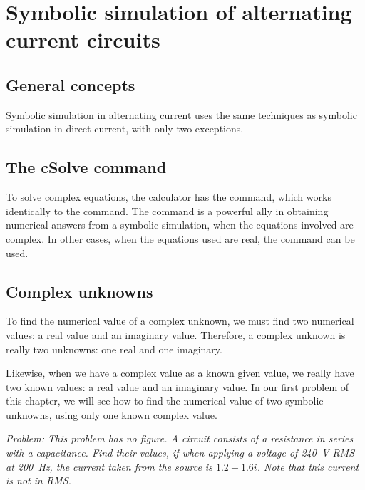 
\chapter{Symbolic simulation of alternating current circuits}

\section{General concepts}

Symbolic simulation in alternating current uses the same techniques
as symbolic simulation in direct current, with only two exceptions.

\section{The cSolve command}

To solve complex equations, the calculator has the 
command, which works identically to the  command. The
 command is a powerful ally in obtaining numerical
answers from a symbolic simulation, when the equations involved are
complex. In other cases, when the equations used are real, the
 command can be used.

\section{Complex unknowns}

To find the numerical value of a complex unknown, we must find two
numerical values: a real value and an imaginary value. Therefore, a
complex unknown is really two unknowns: one real and one imaginary.

Likewise, when we have a complex value as a known given value, we
really have two known values: a real value and an imaginary value.
In our first problem of this chapter, we will see how to find the
numerical value of two symbolic unknowns, using only one known
complex value.


\emph{Problem: This problem has no figure. A circuit consists of a
resistance in series with a capacitance. Find their values, if when
applying a voltage of 240~V RMS at 200~Hz, the current taken from
the source is $1.2 + 1.6i$. Note that this current is not in RMS.}

